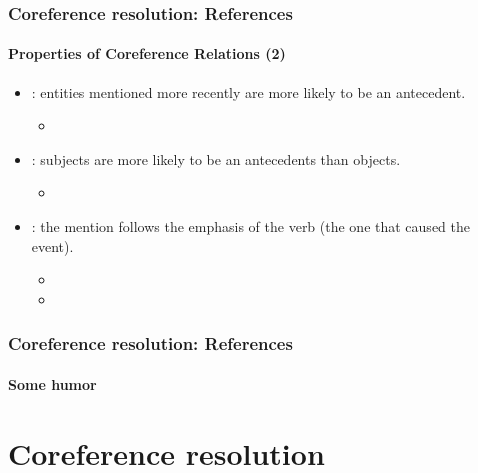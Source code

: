 \documentclass[xcolor=table]{beamer}
\begin{document}
\begin{frame}
	\frametitle{Coreference resolution: References}
	\framesubtitle{Properties of Coreference Relations (2)}
	
	\begin{itemize}
		
		\item {}: entities mentioned more recently are more likely to be an antecedent.
		\begin{itemize}
			\item {}
		\end{itemize}
		
		\item {}: subjects are more likely to be an antecedents than objects.
		\begin{itemize}
			\item {}
		\end{itemize}
		
		\item {}: the mention follows the emphasis of the verb (the one that caused the event).
		\begin{itemize}
			\item {}
			\item {}
		\end{itemize}
	\end{itemize}
	
\end{frame}

\begin{frame}
	\frametitle{Coreference resolution: References}
	\framesubtitle{Some humor}
	
	\begin{center}
	\end{center}
	
\end{frame}

\section{Coreference resolution}
\end{document}
